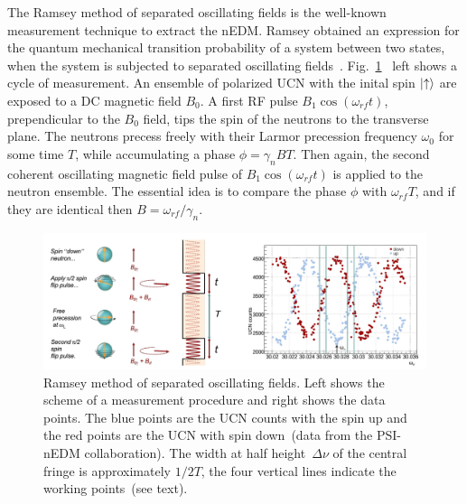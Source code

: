 The Ramsey method of separated oscillating fields is the well-known
measurement technique to extract the nEDM. Ramsey obtained an
expression for the quantum mechanical transition probability of a
system between two states, when the system is subjected to separated
oscillating
fields~\cite{ramsey1950}. Fig.~\ref{fig:ramsey}~\cite{Schmidt2016}
left shows a cycle of measurement. An ensemble of polarized UCN with
the inital spin $\ket{ \uparrow}$ are exposed to a DC magnetic field
$B_0$.  A first RF pulse $B_1 \cos (\omega_{rf}t)$, prependicular to
the $B_0$ field, tips the spin of the neutrons to the transverse
plane. The neutrons precess freely with their Larmor precession
frequency $\omega_0$ for some time $T$, while accumulating a phase
$\phi = \gamma_n BT$. Then again, the second coherent oscillating
magnetic field pulse of $B_1 \cos (\omega_{rf}t)$ is applied to the
neutron ensemble. The essential idea is to compare the phase $\phi$
with $\omega_{rf}T$, and if they are identical then
$B= \omega_{rf} / \gamma_n$.

\begin{figure}[h]
  \centering
  \includegraphics[width=1.0\textwidth]{ramsey.png}
  \caption[Ramsey cycle]{\cite{Schmidt-Wellenburg:2016nfv} Ramsey
    method of separated oscillating fields. Left shows the scheme of a
    measurement procedure and right shows the data points. The blue
    points are the UCN counts with the spin up and the red points are
    the UCN with spin down~(data from the PSI-nEDM collaboration). The
    width at half height~$\Delta \nu$ of the central fringe is
    approximately $1/2T$, the four vertical lines indicate the working
    points~(see text).}
  \label{fig:ramsey}
\end{figure}

